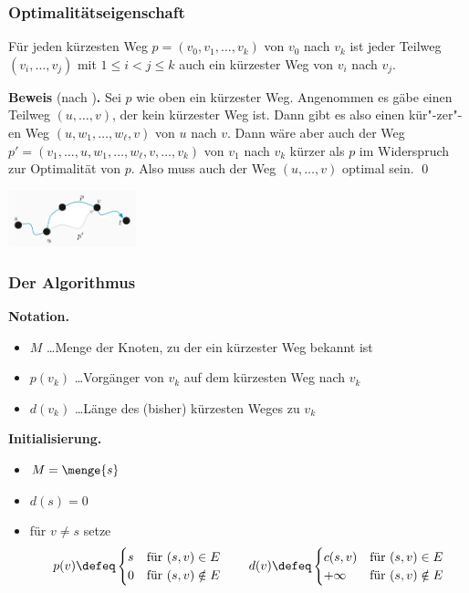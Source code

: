 \documentclass{beamer}
\begin{document}
\begin{frame} \frametitle{Optimalitätseigenschaft}
	\begin{theorem}
		Für jeden kürzesten Weg $p = (v_0, v_1, \dots, v_k)$ von $v_0$ nach $v_k$ ist jeder Teilweg $(v_i, \dots, v_j)$ mit $1 \le i < j \le k$ auch ein kürzester Weg von $v_i$ nach $v_j$.
	\end{theorem}
	\begin{justify}
		\footnotesize
		\textbf{Beweis} (nach \cite{buesing})\textbf{.} Sei $p$ wie oben ein kürzester Weg. Angenommen es gäbe einen Teilweg $(u, \dots, v)$, der kein kürzester Weg ist. Dann gibt es also einen kür"-zer"-en Weg $(u, w_1, \dots, w_\ell, v)$ von $u$ nach $v$. Dann wäre aber auch der Weg $p' = (v_1, \dots, u, w_1, \dots, w_\ell, v, \dots, v_k)$ von $v_1$ nach $v_k$ kürzer als $p$ im Widerspruch zur Optimalität von $p$. Also muss auch der Weg $(u, \dots, v)$ optimal sein. \qed
	\end{justify}

	\centering
	\includegraphics[width=10em]{./optimaleWege.jpg}
\end{frame}

\begin{frame} \frametitle{Der Algorithmus \cite{martinovic}}
	\small
	\textbf{Notation.}
	\begin{itemize}
		\item $M$ \dots Menge der Knoten, zu der ein kürzester Weg bekannt ist
		\item $p(v_k)$ \dots Vorgänger von $v_k$ auf dem kürzesten Weg nach $v_k$
		\item $d(v_k)$ \dots Länge des (bisher) kürzesten Weges zu $v_k$
	\end{itemize}

	\textbf{Initialisierung.}
	\begin{itemize}
		\item $M = \menge{s}$
		\item $d(s) = 0$
		\item für $v \neq s$ setze
		\begin{equation*}
			p(v) \defeq \begin{cases}
			s & \text{für } (s,v) \in E \\ 0 & \text{für } (s,v) \notin E
			\end{cases} 
			\qquad
			d(v) \defeq \begin{cases}
			c(s,v) & \text{für } (s,v) \in E \\ +\infty & \text{für } (s,v) \notin E
			\end{cases}
		\end{equation*}
	\end{itemize}
\end{frame}
\end{document}
